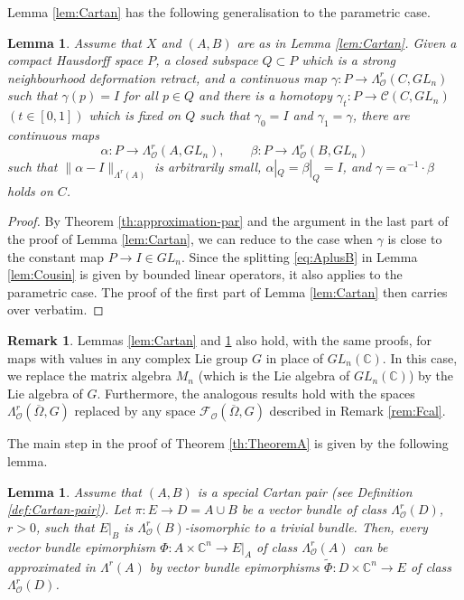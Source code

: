\documentclass[11pt]{amsart}
\numberwithin{equation}{section}
\newtheorem{lemma}[theorem]{Lemma}
\theoremstyle{definition}
\newtheorem{remark}[theorem]{Remark}
\newcommand\Fcal{\mathcal{F}}
\newcommand\Cscr{\mathscr{C}}
\newcommand\Oscr{\mathscr{O}}
\newcommand\C{\mathbb{C}}
\newcommand\wt{\widetilde}
\begin{document}
%
%
Lemma \ref{lem:Cartan} has the following generalisation
to the parametric case.

\begin{lemma}\label{lem:Cartan-par}
Assume that $X$ and $(A,B)$ are as in Lemma  \ref{lem:Cartan}.
Given a compact Hausdorff space $P$, a closed subspace 
$Q\subset P$ which is a strong neighbourhood deformation retract, 
and a continuous map 
$\gamma : P\to \Lambda^r_\Oscr(C,GL_n)$ such that $\gamma(p)=I$
for all $p\in Q$ and there is a homotopy 
$\gamma_t:P\to \Cscr(C,GL_n)$ $(t\in [0,1])$ which is fixed 
on $Q$ such that $\gamma_0=I$ and $\gamma_1=\gamma$,
there are continuous maps 
\[
	\alpha:P \to \Lambda^r_\Oscr(A,GL_n),\qquad 
	\beta:P\to  \Lambda^r_\Oscr(B,GL_n)
\]
such that $\|\alpha-I\|_{\Lambda^r(A)}$ is arbitrarily small,
$\alpha|_Q=\beta|_Q=I$, and 
$\gamma = \alpha^{-1} \cdotp \beta$ holds on $C$.
\end{lemma}

\begin{proof}
By Theorem \ref{th:approximation-par} and the argument
in the last part of the proof of Lemma \ref{lem:Cartan}, we can 
reduce to the case when $\gamma$ is close to the 
constant map $P\to I\in GL_n$. Since the splitting 
\eqref{eq:AplusB} in Lemma \ref{lem:Cousin} is given by bounded 
linear operators, it also applies to the parametric case. The proof
of the first part of Lemma \ref{lem:Cartan} then carries over verbatim.
\end{proof}


\begin{remark} \label{rem:Liegroup} 
Lemmas \ref{lem:Cartan} and \ref{lem:Cartan-par} also hold, with the
same proofs, for maps with values in any complex Lie group $G$ in place
of $GL_n(\C)$. In this case, we replace the matrix algebra
$M_n$ (which is the Lie algebra of $GL_n(\C)$)
by the Lie algebra of $G$.
Furthermore, the analogous results hold with the spaces
$\Lambda^r_\Oscr(\overline\Omega,G)$ replaced by any space
$\Fcal_\Oscr(\overline\Omega,G)$ described in Remark \ref{rem:Fcal}.
\end{remark}

The main step in the proof of Theorem \ref{th:TheoremA} is 
given by the following lemma.

%
%
\begin{lemma}\label{lem:ext-to-bump}
Assume that $(A,B)$ is a special Cartan pair 
(see Definition \ref{def:Cartan-pair}).
Let $\pi:E\to D=A\cup B$ be a vector bundle of class
$\Lambda_\Oscr^r(D)$, $r>0$, such that $E|_B$ is 
$\Lambda_\Oscr^r(B)$-isomorphic to a trivial bundle.
Then, every vector bundle epimorphism 
$\Phi:A\times\C^n \to E|_A$ of class $\Lambda_\Oscr^r(A)$
can be approximated in $\Lambda^r(A)$ by vector bundle 
epimorphisms $\wt \Phi:D\times\C^n \to E$ of class $\Lambda_\Oscr^r(D)$. 
\end{lemma}
\end{document}
